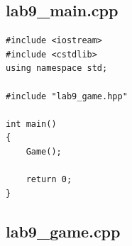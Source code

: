 \documentclass[a4paper,12pt,oneside]{book}
\begin{document}
\subsection*{lab9\_main.cpp}

\begin{lstlisting}[style=code]
#include <iostream>
#include <cstdlib>
using namespace std;

#include "lab9_game.hpp"

int main()
{
    Game();

    return 0;
}
\end{lstlisting}

\subsection*{lab9\_game.cpp}
\end{document}
